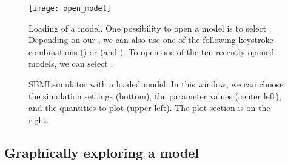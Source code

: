 \begin{figure}[t]
\centering
\texttt{[image: open\_model]}
\caption[Loading of a model]{Loading of a model.
One possibility to open a model is to select .
Depending on our \OS, we can also use one of the following keystroke combinations  (\MacOSX) or  (\Linux and \Windows).
To open one of the ten recently opened models, we can select .}
\label{fig:openModel}
\end{figure}
\begin{figure}[t]
\centering
{}
\caption[SBMLsimulator with a loaded model]{SBMLsimulator with a loaded model.
In this window, we can choose the simulation settings (bottom), the parameter values (center left), and the quantities to plot (upper left).
The plot section is on the right.}
\label{fig:modelOpened}
\end{figure}

\subsection{Graphically exploring a model}
\label{sec:ModelTree}

